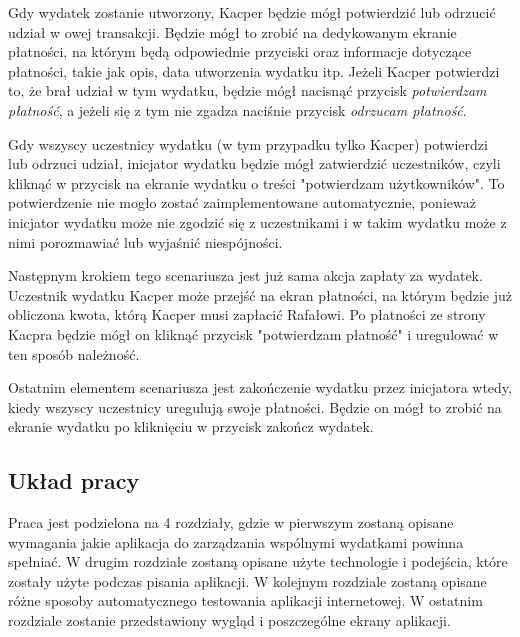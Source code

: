 Gdy wydatek zostanie utworzony, Kacper będzie mógł potwierdzić lub odrzucić udział w owej transakcji. Będzie mógł to zrobić na dedykowanym ekranie płatności, na którym będą odpowiednie przyciski oraz informacje dotyczące płatności, takie jak opis, data utworzenia wydatku itp. Jeżeli Kacper potwierdzi to, że brał udział w tym wydatku, będzie mógł nacisnąć przycisk \emph{potwierdzam płatność}, a jeżeli się z tym nie zgadza naciśnie przycisk \emph{odrzucam płatność}.

Gdy wszyscy uczestnicy wydatku (w tym przypadku tylko Kacper) potwierdzi lub odrzuci udział, inicjator wydatku będzie mógł zatwierdzić uczestników, czyli kliknąć w przycisk na ekranie wydatku o treści "potwierdzam użytkowników". To potwierdzenie nie mogło zostać zaimplementowane automatycznie, ponieważ inicjator wydatku może nie zgodzić się z uczestnikami i w takim wydatku może z nimi porozmawiać lub wyjaśnić niespójności.

Następnym krokiem tego scenariusza jest już sama akcja zapłaty za wydatek. Uczestnik wydatku Kacper może przejść na ekran płatności, na którym będzie już obliczona kwota, którą Kacper musi zapłacić Rafałowi. Po płatności ze strony Kacpra będzie mógł on kliknąć przycisk "potwierdzam płatność" i uregulować w ten sposób należność.

Ostatnim elementem scenariusza jest zakończenie wydatku przez inicjatora wtedy, kiedy wszyscy uczestnicy uregulują swoje płatności. Będzie on mógł to zrobić na ekranie wydatku po kliknięciu w przycisk zakończ wydatek.

\subsection{Układ pracy}
Praca jest podzielona na 4 rozdziały, gdzie w pierwszym zostaną opisane wymagania jakie aplikacja do zarządzania wspólnymi wydatkami powinna spełniać. W drugim rozdziale zostaną opisane użyte technologie i podejścia, które zostały użyte podczas pisania aplikacji. W kolejnym rozdziale zostaną opisane różne sposoby automatycznego testowania aplikacji internetowej. W ostatnim rozdziale zostanie przedstawiony wygląd i poszczególne ekrany aplikacji.


